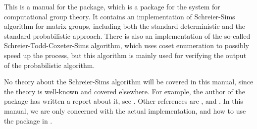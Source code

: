 
This is a manual for the  package, which is a
package for the {\GAP} system for computational group theory. It
contains an implementation of Schreier-Sims algorithm for matrix
groups, including both the standard deterministic and the standard
probabilistic approach. There is also an implementation of the
so-called Schreier-Todd-Coxeter-Sims algorithm, which uses coset
enumeration to possibly speed up the process, but this algorithm is
mainly used for verifying the output of the probabilistic algorithm.

No theory about the Schreier-Sims algorithm will be covered in this
manual, since the theory is well-known and covered elsewhere. For
example, the author of the package has written a report about it, see
\cite{baarnhielm04}. Other references are \cite{butler91},
\cite{soicher98} and \cite{seress03}. In this manual, we are only
concerned with the actual implementation, and how to use the package
in {\GAP}.

